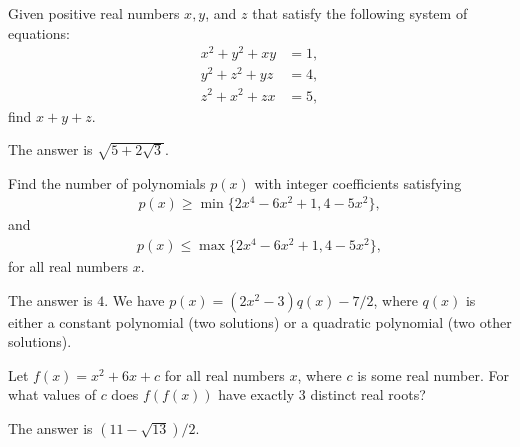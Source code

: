 \documentclass[11pt]{article}
\theoremstyle{definition}
\begin{document}
\begin{question}[name={2011 HMMT, Guts, Problem 17}]
	Given positive real numbers $x,y$, and $z$ that satisfy the following system of equations:
	\begin{align*}
		x^2+y^2+xy&=1,\\
		y^2+z^2+yz&=4,\\
		z^2+x^2+zx&=5,
	\end{align*}
	find $x+y+z$.
\end{question}

\begin{solution}
	The answer is $\boxed{\sqrt{5+2\sqrt{3}}}$.
\end{solution}







\begin{question}[name={2011 HMMT, Guts, Problem 27}]
	Find the number of polynomials $p(x)$ with integer coefficients satisfying
	\begin{align*}
		p(x) \geq \min\{2x^4-6x^2+1,4-5x^2\},
	\end{align*}
	and
	\begin{align*}
		p(x) \leq \max\{2x^4-6x^2+1,4-5x^2\},
	\end{align*}
	for all real numbers $x$.
\end{question}

\begin{solution}
	The answer is $\boxed{4}$. We have $p(x)=(2x^2-3)q(x)-7/2$, where $q(x)$ is either a constant polynomial (two solutions) or a quadratic polynomial (two other solutions).  
\end{solution}





\begin{question}[name={2011 HMMT, Algebra \& Geometry, Problem 27}]
	Let $f(x) = x^2 + 6x + c$ for all real numbers $x$, where $c$ is some real number. For what values of $c$ does
	$f(f(x))$ have exactly $3$ distinct real roots?
\end{question}

\begin{solution}
	The answer is $\boxed{(11-\sqrt{13})/{2}}$.
\end{solution}
\end{document}
